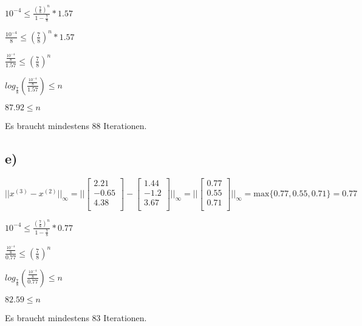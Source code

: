 \documentclass{article}
\begin{document}
\(10^{-4} \leq \frac{(\frac{7}{8})^n}{1 - \frac{7}{8}} * 1.57\)

\(\frac{10^{-4}}{8} \leq (\frac{7}{8})^n * 1.57\)

\(\frac{\frac{10^{-4}}{8}}{1.57} \leq (\frac{7}{8})^n\)

\(log_{\frac{7}{8}}\left(\frac{\frac{10^{-4}}{8}}{1.57}\right) \leq n\)

\(87.92 \leq n\)

Es braucht mindestens 88 Iterationen.

\newpage
\subsection*{e)}

\(
||x^{(3)} - x^{(2)}||_\infty
=
||
\begin{bmatrix} 
2.21\\
-0.65\\
4.38\\
\end{bmatrix}
-
\begin{bmatrix} 
1.44\\
-1.2\\
3.67\\
\end{bmatrix}
||_\infty
=
||
\begin{bmatrix} 
0.77\\
0.55\\
0.71\\
\end{bmatrix}
||_\infty
=
\text{max}\{0.77,0.55,0.71\} = 0.77
\)

\(10^{-4} \leq \frac{(\frac{7}{8})^n}{1 - \frac{7}{8}} * 0.77\)

\(\frac{\frac{10^{-4}}{8}}{0.77} \leq (\frac{7}{8})^n\)

\(log_{\frac{7}{8}}\left(\frac{\frac{10^{-4}}{8}}{0.77}\right) \leq n\)

\(82.59 \leq n\)

Es braucht mindestens 83 Iterationen.
\end{document}
